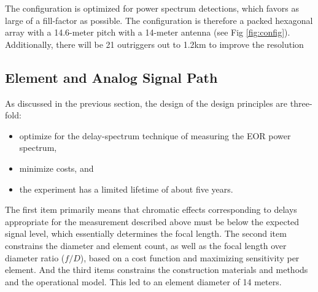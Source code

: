 \documentclass{article}
\begin{document}
The configuration is optimized for power spectrum detections, which favors as large of a fill-factor as possible.  The configuration is therefore a packed hexagonal array with a 14.6-meter pitch with a 14-meter antenna (see Fig \ref{fig:config}).  Additionally, there will be 21 outriggers out to 1.2km to improve the resolution 




\subsection{Element and Analog Signal Path}
\label{sec:element}
As discussed in the previous section, the design of the design principles are three-fold:
\begin{itemize}
\item optimize for the delay-spectrum technique of measuring the EOR power spectrum,
\item minimize costs, and
\item the experiment has a limited lifetime of about five years.
\end{itemize}
The first item primarily means that chromatic effects corresponding to delays appropriate for the measurement described above must be below the expected signal level, which essentially determines the focal length.  The second item constrains the diameter and element count, as well as the focal length over diameter ratio ($f/D$), based on a cost function and maximizing sensitivity per element.  And the third items constrains the construction materials and methods and the operational model.  This led to an element diameter of 14 meters.
\end{document}
